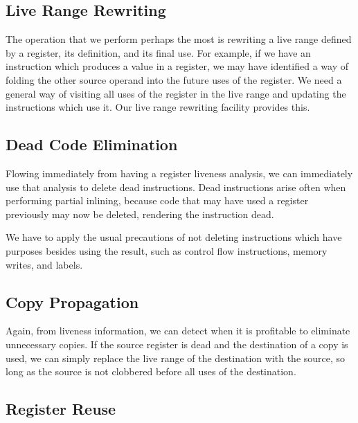 \subsection{Live Range Rewriting}

The operation that we perform perhaps the most is rewriting a live range defined
by a register, its definition, and its final use.  For example, if we have an
instruction which produces a value in a register, we may have identified a way
of folding the other source operand into the future uses of the register.  We
need a general way of visiting all uses of the register in the live range and
updating the instructions which use it.  Our live range rewriting facility
provides this.

\subsection{Dead Code Elimination}

Flowing immediately from having a register liveness analysis, we can immediately
use that analysis to delete dead instructions.  Dead instructions arise often
when performing partial inlining, because code that may have used a register
previously may now be deleted, rendering the instruction dead.

We have to apply the usual precautions of not deleting instructions which have
purposes besides using the result, such as control flow instructions, memory
writes, and labels.

\subsection{Copy Propagation}

Again, from liveness information, we can detect when it is profitable to
eliminate unnecessary copies.  If the source register is dead and the
destination of a copy is used, we can simply replace the live range of the
destination with the source, so long as the source is not clobbered before all
uses of the destination.

\subsection{Register Reuse}

